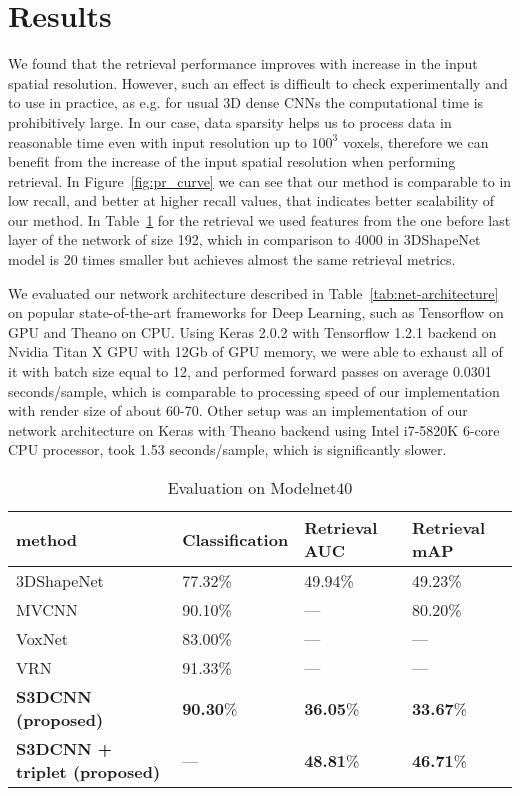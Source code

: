 \section{Results}
\label{sec:5}
We found that the retrieval performance improves with increase in the input spatial resolution. However, such an effect is difficult to check experimentally and to use in practice, as e.g. for usual 3D dense CNNs the computational time is prohibitively large. In our case, data sparsity helps us to process data in reasonable time even with input resolution up to $100^3$ voxels, therefore we can benefit from the increase of the input spatial resolution when performing retrieval.
In Figure~\ref{fig:pr_curve} we can see that our method is comparable to \cite{wu20153d} in low recall, and better at higher recall values, that indicates better scalability of our method.
In Table~\ref{tab:classification} for the retrieval we used features from the one before last layer of the network of size 192, which in  comparison to 4000 in 3DShapeNet model \cite{wu20153d} is 20 times smaller but achieves almost the same retrieval metrics.

We evaluated our network architecture described in Table~\ref{tab:net-architecture} on popular state-of-the-art frameworks for Deep Learning, such as Tensorflow\cite{tensorflow2015-whitepaper} on GPU and Theano\cite{2016arXiv160502688short} on CPU.
Using Keras\cite{chollet2015keras} 2.0.2 with Tensorflow\cite{tensorflow2015-whitepaper} 1.2.1 backend on Nvidia Titan X GPU with 12Gb of GPU memory, we were able to exhaust all of it with batch size equal to 12, and performed forward passes on average 0.0301 seconds/sample, which is comparable to processing speed of our implementation with render size of about 60-70.
Other setup was an implementation of our network architecture on Keras with Theano backend using Intel i7-5820K 6-core CPU processor, took 1.53 seconds/sample, which is significantly slower.


\begin{table}[t]
  \caption{Evaluation on Modelnet40}
  \label{tab:classification}
  \centering
  \begin{tabular}{llll}
    \toprule
    method & Classification & Retrieval AUC & Retrieval mAP \\
    \midrule
    3DShapeNet \cite{wu20153d} & 77.32\% & 49.94\% & 49.23\% \\
    MVCNN \cite{su15mvcnn} & 90.10\% & --- & 80.20\% \\
    VoxNet \cite{maturana2015voxnet} & 83.00\% & --- & --- \\
    VRN \cite{brock2016generative} & 91.33\% & --- & --- \\
    \textbf{S3DCNN (proposed)} & \textbf{90.30}\% & \textbf{36.05}\% & \textbf{33.67}\% \\
    \textbf{S3DCNN + triplet (proposed)} & --- & \textbf{48.81}\% & \textbf{46.71}\% \\
    \bottomrule
  \end{tabular}
\end{table}


